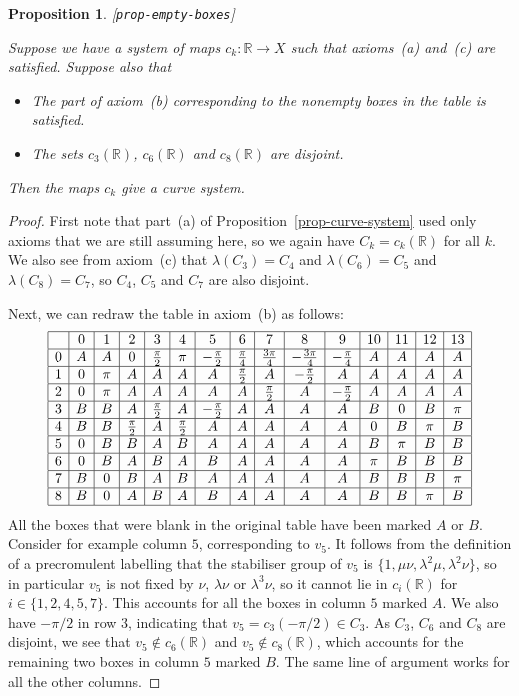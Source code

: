 \documentclass[reqno]{amsart}
\newcommand{\lbl}[1]{\label{#1}\textup{[\texttt{#1}]}\par}
\newcommand{\lbl}{\label}
\newcommand{\lm}        {\lambda}
\newcommand{\R}         {{\mathbb{R}}}
\newcommand{\ppi}       {\tfrac{\pi}{2}}
\renewcommand{\:}{\colon}
\newtheorem{proposition}[theorem]{Proposition}
\theoremstyle{definition}
\begin{document}
\begin{proposition}\lbl{prop-empty-boxes}
 Suppose we have a system of maps $c_k\:\R\to X$ such that axioms~(a)
 and~(c) are satisfied.  Suppose also that
 \begin{itemize}
  \item[(p)] The part of axiom~(b) corresponding to the nonempty boxes
   in the table is satisfied.
  \item[(q)] The sets $c_3(\R)$, $c_6(\R)$ and $c_8(\R)$ are disjoint.
 \end{itemize}
 Then the maps $c_k$ give a curve system.
\end{proposition}
\begin{proof}
 First note that part~(a) of Proposition~\ref{prop-curve-system} used
 only axioms that we are still assuming here, so we again have
 $C_k=c_k(\R)$ for all $k$.  We also see from axiom~(c) that
 $\lm(C_3)=C_4$ and $\lm(C_6)=C_5$ and $\lm(C_8)=C_7$, so $C_4$, $C_5$
 and $C_7$ are also disjoint.

 Next, we can redraw the table in axiom~(b) as follows:
 \[ \begin{array}{|c|c|c|c|c|c|c|c|c|c|c|c|c|c|c|}
   \hline
     &0&1  &2   &3   &4   &5    &6&7&8&9&10&11&12&13\\ \hline
    0&A&A  &0   &\ppi&\pi &-\ppi&\tfrac{\pi}{4}&\tfrac{3\pi}{4}&-\tfrac{3\pi}{4}&-\tfrac{\pi}{4}&A&A&A&A\\ \hline
    1&0&\pi&A   &A   &A   &A    &\ppi&A&-\ppi&A&A&A&A&A\\ \hline
    2&0&\pi&A   &A   &A   &A    &A&\ppi&A&-\ppi&A&A&A&A\\ \hline
    3&B&B  &A   &\ppi&A   &-\ppi&A&A&A&A&B&0&B&\pi\\ \hline
    4&B&B  &\ppi&A   &\ppi&A    &A&A&A&A&0&B&\pi&B\\ \hline
    5&0&B  &B   &A   &B   &A    &A&A&A&A&B&\pi&B&B\\ \hline
    6&0&B  &A   &B   &A   &B    &A&A&A&A&\pi&B&B&B\\ \hline
    7&B&0  &B   &A   &B   &A    &A&A&A&A&B&B&B&\pi\\ \hline
    8&B&0  &A   &B   &A   &B    &A&A&A&A&B&B&\pi&B\\ \hline
 \end{array} \]
 All the boxes that were blank in the original table have been marked
 $A$ or $B$.  Consider for example column $5$, corresponding to
 $v_5$.  It follows from the definition of a precromulent labelling
 that the stabiliser group of $v_5$ is
 $\{1,\mu\nu,\lm^2\mu,\lm^2\nu\}$, so in particular $v_5$ is not fixed
 by $\nu$, $\lm\nu$ or $\lm^3\nu$, so it cannot lie in $c_i(\R)$ for
 $i\in\{1,2,4,5,7\}$.  This accounts for all the boxes in column $5$
 marked $A$.  We also have $-\pi/2$ in row $3$, indicating that
 $v_5=c_3(-\pi/2)\in C_3$.  As $C_3$, $C_6$ and $C_8$ are disjoint, we
 see that $v_5\not\in c_6(\R)$ and $v_5\not\in c_8(\R)$, which
 accounts for the remaining two boxes in column $5$ marked $B$.  The
 same line of argument works for all the other columns.
\end{proof}
\end{document}
